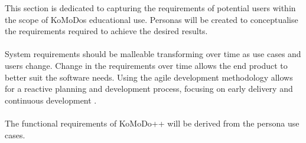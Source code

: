\graphicspath{ {images/requirements/} }

This section is dedicated to capturing the requirements of potential users within the scope of KoMoDos educational use. Personas will be created to conceptualise the requirements required to achieve the desired results.\\\\
%
System requirements should be malleable transforming over time as use cases and users change. Change in the requirements over time allows the end product to better suit the software needs. Using the agile development methodology allows for a reactive planning and development process, focusing on early delivery and continuous development \cite{wikipedia_agile_dev}.\\\\
%
The functional requirements of KoMoDo++ will be derived from the persona use cases.

